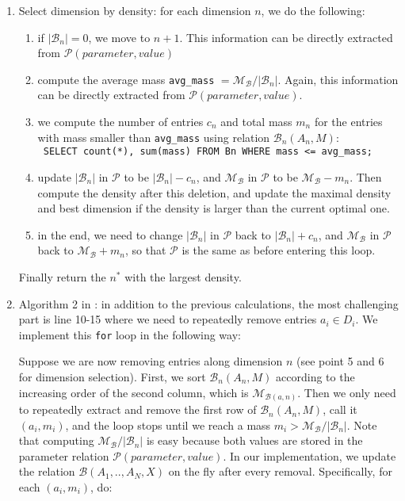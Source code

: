 \begin{enumerate}
\item Select dimension by density: for each dimension $n$, we do the following:
\begin{enumerate}
\item if $|\mathcal{B}_n| = 0$, we move to $n+1$. This information can be directly extracted from $\mathcal{P}(parameter, value)$
\item compute the average mass {\tt avg\_mass} $ = \mathcal{M}_{\mathcal{B}} / {|\mathcal{B}_n|}$. Again, this information can be directly extracted from $\mathcal{P}(parameter, value)$.
\item we compute the number of entries $c_n$ and total mass $m_n$ for the entries with mass smaller than {\tt avg\_mass} using relation $\mathcal{B}_n(A_n, M)$:\\
{\tt 
SELECT count(*), sum(mass) FROM Bn WHERE mass <= avg\_mass;
}
\item update $|\mathcal{B}_n|$ in $\mathcal{P}$ to be $|\mathcal{B}_n|-c_n$, and $\mathcal{M}_{\mathcal{B}}$ in $\mathcal{P}$ to be $\mathcal{M}_{\mathcal{B}} - m_n$. 
Then compute the density after this deletion, and update the maximal density and best dimension if the density is larger than the current optimal one. 
\item in the end, we need to change $|\mathcal{B}_n|$ in $\mathcal{P}$ back to  $|\mathcal{B}_n|+c_n$, and $\mathcal{M}_{\mathcal{B}}$ in $\mathcal{P}$ back to $\mathcal{M}_{\mathcal{B}} + m_n$, so that $\mathcal{P}$ is the same as before entering this loop. 
\end{enumerate}
Finally return the $n^*$ with the largest density.

\item Algorithm 2 in  \cite{shin2017d}: in addition to the previous calculations, the most challenging part is line 10-15 where we need to repeatedly remove entries $a_i \in D_i$. We implement this {\tt for} loop in the following way: 

Suppose we are now removing entries along dimension $n$ (see point 5 and 6 for dimension selection). First, we sort $\mathcal{B}_n(A_n, M)$ according to the increasing order of the second column, which is $\mathcal{M}_{\mathcal{B}(a, n)}$. Then we only need to repeatedly extract and remove the first row of  $\mathcal{B}_n(A_n, M)$, call it $(a_i, m_i)$, and the loop stops until we reach a mass $m_i > \mathcal{M}_{\mathcal{B}} / {|\mathcal{B}_n|}$.  Note that computing $\mathcal{M}_{\mathcal{B}} / {|\mathcal{B}_n|}$ is easy because both values are stored in the parameter relation $\mathcal{P}(parameter, value)$. In our implementation, we update the relation $\mathcal{B}(A_1, .., A_N, X)$ on the fly after every removal. Specifically, for each $(a_i, m_i)$, do:


\end{enumerate}
